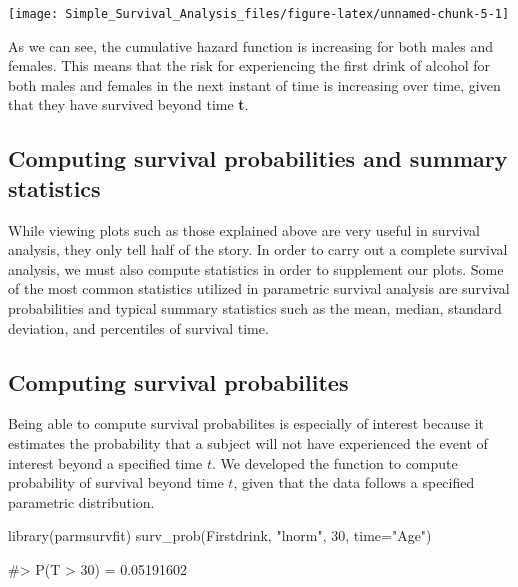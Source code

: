 \begin{Schunk}

\texttt{[image: Simple\_Survival\_Analysis\_files/figure-latex/unnamed-chunk-5-1]} \end{Schunk}

As we can see, the cumulative hazard function is increasing for both
males and females. This means that the risk for experiencing the first
drink of alcohol for both males and females in the next instant of time
is increasing over time, given that they have survived beyond time
\textbf{t}.

\hypertarget{computing-survival-probabilities-and-summary-statistics}{%
\subsection{Computing survival probabilities and summary
statistics}\label{computing-survival-probabilities-and-summary-statistics}}

While viewing plots such as those explained above are very useful in
survival analysis, they only tell half of the story. In order to carry
out a complete survival analysis, we must also compute statistics in
order to supplement our plots. Some of the most common statistics
utilized in parametric survival analysis are survival probabilities and
typical summary statistics such as the mean, median, standard deviation,
and percentiles of survival time.

\hypertarget{computing-survival-probabilites}{%
\subsection{Computing survival
probabilites}\label{computing-survival-probabilites}}

Being able to compute survival probabilites is especially of interest
because it estimates the probability that a subject will not have
experienced the event of interest beyond a specified time \(t\). We
developed the function  to compute probability of
survival beyond time \(t\), given that the data follows a specified
parametric distribution.

\begin{Schunk}
\begin{Sinput}
library(parmsurvfit)
surv_prob(Firstdrink, "lnorm", 30, time="Age")
\end{Sinput}
\begin{Soutput}
#> P(T > 30) = 0.05191602
\end{Soutput}
\end{Schunk}

